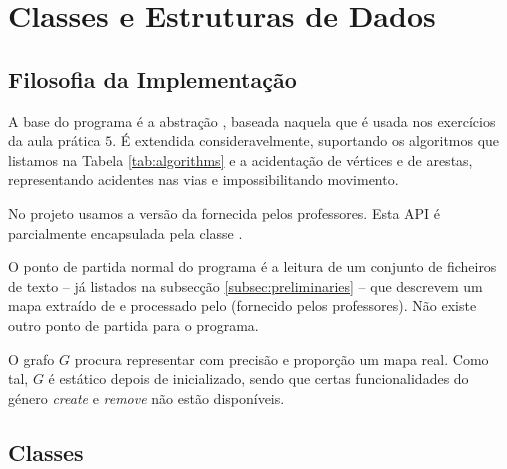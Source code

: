 \documentclass[relatorio.tex]{subfiles}
\begin{document}
\section{Classes e Estruturas de Dados}
\label{sec:classdata}

\subsection{Filosofia da Implementação}
\label{subsec:philosophy}

A base do programa é a abstração , baseada naquela
que é usada nos exercícios da aula prática $5$. É extendida
consideravelmente, suportando os algoritmos que listamos na Tabela
\ref{tab:algorithms} e a acidentação de vértices e de arestas,
representando acidentes nas vias e impossibilitando movimento.

No projeto usamos a versão  da  fornecida
pelos professores. Esta API é parcialmente encapsulada pela
classe .

O ponto de partida normal do programa é a leitura de um conjunto
de ficheiros de texto -- já listados na subsecção
\ref{subsec:preliminaries} -- que descrevem um mapa extraído de
\osm{} e processado pelo  (fornecido pelos
professores). Não existe outro ponto de partida para o programa.

O grafo $G$ procura representar com precisão e proporção um mapa
real. Como tal, $G$ é estático depois de inicializado, sendo que
certas funcionalidades do género \textsl{create} e \textsl{remove}
não estão disponíveis.


\subsection{Classes}
\label{subsec:graph}
\end{document}

